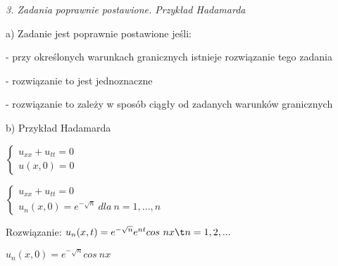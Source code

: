 \textit{3. Zadania poprawnie postawione. Przykład Hadamarda}

a) Zadanie jest poprawnie postawione jeśli:

  - przy określonych warunkach granicznych istnieje rozwiązanie tego zadania
  
  - rozwiązanie to jest jednoznaczne

  - rozwiązanie to zależy w sposób ciągły od zadanych warunków granicznych

b) Przykład Hadamarda

$\left\{\begin{matrix} u_{xx} + u_{tt} = 0 \\ u(x,0) = 0 \end{matrix}\right.$

$\left\{\begin{matrix} u_{xx} + u_{tt} = 0 \\ u_n(x,0) = e^{-\sqrt{n}}\ dla\ n = 1, ..., n \end{matrix}\right.$

Rozwiązanie: $u_n(x,t) = e^{-\sqrt{n}}e^{nt}cos\ nx\t n = 1, 2, ...$

$u_n(x,0) = e^{-\sqrt{n}}cos\ nx$